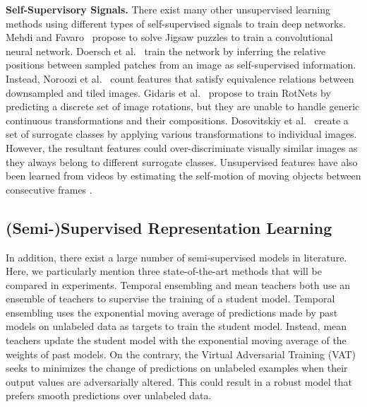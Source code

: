 \documentclass[10pt,journal,compsoc,twoside]{IEEEtran}
\begin{document}
{\noindent \bf Self-Supervisory Signals.} There exist many other unsupervised learning methods using different types of self-supervised signals to train deep networks.
Mehdi and Favaro~\cite{noroozi2016unsupervised} propose to solve Jigsaw puzzles to train a convolutional neural network.
Doersch et al.~\cite{doersch2015unsupervised} train the network by inferring the relative positions between sampled patches from an image as self-supervised information. Instead, Noroozi et al.~\cite{noroozi2017representation} count features that satisfy equivalence relations between downsampled and tiled images. Gidaris et al.~\cite{gidaris2018unsupervised} propose to train RotNets by predicting a discrete set of image rotations, but they are unable to handle generic continuous transformations and their compositions. Dosovitskiy et al.~\cite{dosovitskiy2014discriminative} create a set of surrogate classes by applying various transformations to individual images. However, the resultant features could over-discriminate visually similar images as they always belong to different surrogate classes.
Unsupervised features have also been learned from videos by estimating the self-motion of moving objects between consecutive frames \cite{agrawal2015learning}.

\subsection{(Semi-)Supervised Representation Learning}

In addition, there exist a large number of semi-supervised models in literature. Here, we particularly mention three  state-of-the-art methods that will be compared in experiments.  Temporal ensembling \cite{laine2016temporal} and mean teachers \cite{tarvainen2017mean} both use an ensemble of teachers to supervise the training of a student model. Temporal ensembling uses the exponential moving average of predictions made by past models on unlabeled data as targets to train the student model. Instead, mean teachers update the student model with the exponential moving average of the weights of past models. On the contrary, the Virtual Adversarial Training (VAT) \cite{miyato2018virtual} seeks to minimizes the change of predictions on unlabeled examples when their output values are adversarially altered. This could result in a robust model that prefers smooth predictions over unlabeled data.
\end{document}
